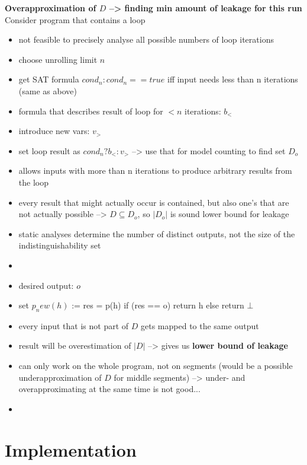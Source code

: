 \textbf{Overapproximation of $D$ --> finding min amount of leakage for this run}
Consider program that contains a loop
\begin{itemize}
    \item not feasible to precisely analyse all possible numbers of loop iterations
    \item choose unrolling limit $n$
    \item get SAT formula $cond_n: cond_n == true$ iff input needs less than n iterations (same as above)
    \item formula that describes result of loop for $< n$ iterations: $b_{<}$
    \item introduce new vars: $v_>$
    \item set loop result as $cond_n ? b_{<} : v_>$ --> use that for model counting to find set $D_o$
    \item allows inputs with more than n iterations to produce arbitrary results from the loop
    \item every result that might actually occur is contained, but also one's that are not actually possible --> $D \subseteq D_o$, so $|D_o|$ is sound lower bound for leakage
\end{itemize}


\begin{itemize}
    \item static analyses determine the number of distinct outputs, not the size of the indistinguishability set
    \item {}
    \item desired output: $o$
    \item set $p_new(h)$ := res = p(h) if (res == o) return h else return $\bot$
    \item every input that is not part of $D$ gets mapped to the same output
    \item result will be overestimation of $|D|$ --> gives us \textbf{lower bound of leakage}
    \item can only work on the whole program, not on segments (would be a possible underapproximation of $D$ for middle segments) --> under- and overapproximating at the same time is not good...
    \item {}
\end{itemize}

\section{Implementation}